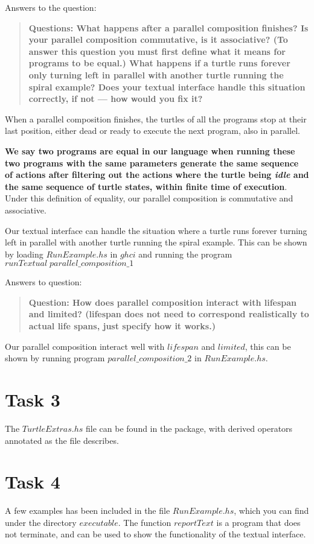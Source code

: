\documentclass[10pt]{article}
\begin{document}
Answers to the question:
\begin{quote}
\textbf{Questions: What happens after a parallel composition finishes? Is your parallel composition commutative, is it associative? (To answer this question you must first define what it means for programs to be equal.) What happens if a turtle runs forever only turning left in parallel with another turtle running the spiral example? Does your textual interface handle this situation correctly, if not — how would you fix it?}
\end{quote}
When a parallel composition finishes, the turtles of all the programs stop at their last position, either dead or ready to execute the next program, also in parallel.

\textbf{We say two programs are equal in our language when running these two programs with the same parameters generate the same sequence of actions after filtering out the actions where the turtle being \textit{idle} and the same sequence of  turtle states, within finite time of execution}. Under this definition of equality, our parallel composition is commutative and associative.

Our textual interface can handle the situation where a turtle runs forever turning left in parallel with another turtle running the spiral example. This can be shown by loading $RunExample.hs$ in $ghci$ and running the program $runTextual\; parallel\_composition\_1$

Answers to question:
\begin{quote}
\textbf{Question: How does parallel composition interact with lifespan and limited? (lifespan does not need to correspond realistically to actual life spans, just specify how it works.)}
\end{quote}
Our parallel composition interact well with $lifespan$ and $limited$, this can be shown by running program $parallel\_composition\_2$ in $RunExample.hs$.

\section*{Task 3}
The $TurtleExtras.hs$ file can be found in the package, with derived operators annotated as the file describes.

\section*{Task 4}
A few examples has been included in the file $RunExample.hs$, which you can find under the directory $executable$. The function $reportText$ is a program that does not terminate, and can be used to show the functionality of the textual interface.
\end{document}
